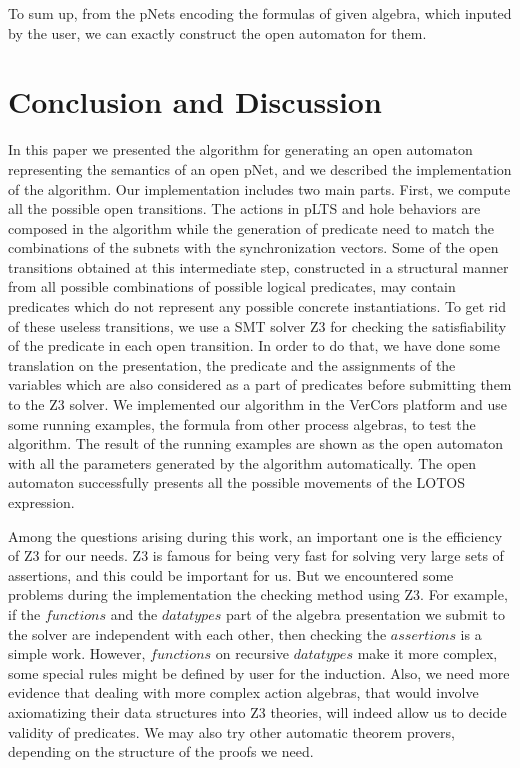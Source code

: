 \documentclass{lncs/llncs}
\newcommand{\QIN}[1]{\textcolor{airforceblue}{#1}}
\begin{document}
\QIN{
To sum up, from the pNets encoding the formulas of given algebra, which inputed by the user, we can exactly construct
the open automaton for them. 
}


\section{Conclusion and Discussion}
\label{section:conclusion}

In this paper we presented the algorithm for generating an open
automaton representing the semantics of an open pNet, and we described
the implementation of the
algorithm. Our implementation includes two main parts. First, we
compute all the possible open transitions. The actions in pLTS and
hole behaviors are composed in the algorithm while the generation of
predicate need to match the combinations of the subnets with the
synchronization vectors. Some of the open transitions obtained at this
intermediate step, constructed in a structural manner from all
possible combinations of possible logical predicates, may
contain predicates which do not represent any possible concrete
instantiations. 
To get rid of these useless transitions, we use a SMT solver Z3 for checking the
satisfiability of the predicate in each open transition. In
order to do that, we have done some translation on the presentation,
the predicate and the assignments of the variables which are also
considered as a part of predicates before submitting them to the
Z3 solver. We implemented our algorithm in the VerCors platform and use some
running examples, the formula from other process algebras, to test the
algorithm. The result of the running examples are shown as the open
automaton with all the parameters generated by the algorithm
automatically. The open automaton successfully presents all the
possible movements of the LOTOS expression.   

Among the questions arising during this work, an important one is the
efficiency of Z3 for our needs. Z3 is famous for being very fast for
solving very large sets of assertions, and this could be important for
us. But we encountered  some problems during the implementation the
checking method using Z3. For example, if the $functions$ and the
$datatypes$ part of the algebra presentation we submit to the solver
are independent with each other, then checking the $assertions$ is a
simple work. However, $functions$ on recursive $datatypes$ make it
more complex, some special rules might be defined by user for the
induction. Also, we need more evidence that dealing with more complex
action algebras, that would involve axiomatizing their data structures
into Z3 theories, will indeed allow us to decide validity of
predicates.
We may also try other automatic theorem provers, depending on the structure of the proofs we need.
\end{document}
